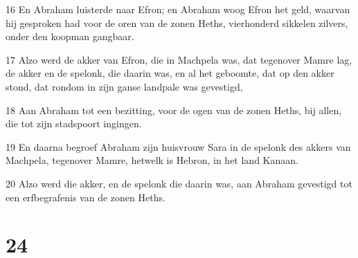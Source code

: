 \par 16 En Abraham luisterde naar Efron; en Abraham woog Efron het geld, waarvan hij gesproken had voor de oren van de zonen Heths, vierhonderd sikkelen zilvers, onder den koopman gangbaar.
\par 17 Alzo werd de akker van Efron, die in Machpela was, dat tegenover Mamre lag, de akker en de spelonk, die daarin was, en al het geboomte, dat op den akker stond, dat rondom in zijn ganse landpale was gevestigd,
\par 18 Aan Abraham tot een bezitting, voor de ogen van de zonen Heths, bij allen, die tot zijn stadspoort ingingen.
\par 19 En daarna begroef Abraham zijn huisvrouw Sara in de spelonk des akkers van Machpela, tegenover Mamre, hetwelk is Hebron, in het land Kanaan.
\par 20 Alzo werd die akker, en de spelonk die daarin was, aan Abraham gevestigd tot een erfbegrafenis van de zonen Heths.

\chapter{24}

